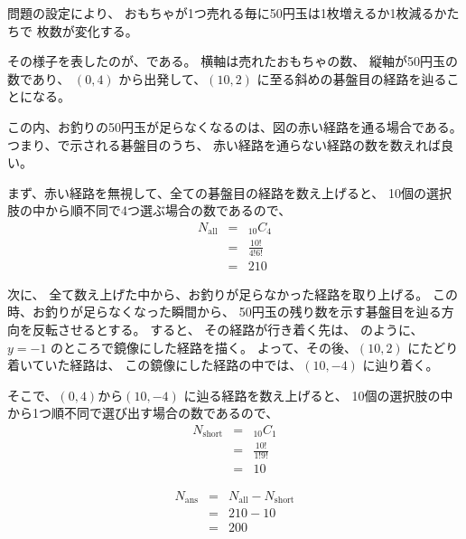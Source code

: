 問題の設定により、
おもちゃが1つ売れる毎に50円玉は1枚増えるか1枚減るかたちで
枚数が変化する。

その様子を表したのが、である。
横軸は売れたおもちゃの数、
縦軸が50円玉の数であり、
$(0,4)$ から出発して、$(10,2)$ に至る斜めの碁盤目の経路を辿ることになる。

この内、お釣りの50円玉が足らなくなるのは、図の赤い経路を通る場合である。
つまり、で示される碁盤目のうち、
赤い経路を通らない経路の数を数えれば良い。

まず、赤い経路を無視して、全ての碁盤目の経路を数え上げると、
10個の選択肢の中から順不同で4つ選ぶ場合の数であるので、
  \begin{eqnarray}
    N_{\text{all}} & = & _{10}C_{4}
  \\
      & = &
        \frac{10!}{4! 6!}
  \\
      & = &
        210
  \end{eqnarray}
  
次に、
全て数え上げた中から、お釣りが足らなかった経路を取り上げる。
この時、お釣りが足らなくなった瞬間から、
50円玉の残り数を示す碁盤目を辿る方向を反転させるとする。
すると、
その経路が行き着く先は、
のように、
$y=-1$ のところで鏡像にした経路を描く。
よって、その後、$(10,2)$ にたどり着いていた経路は、
この鏡像にした経路の中では、$(10,-4)$ に辿り着く。

そこで、$(0,4)$から$(10,-4)$ に辿る経路を数え上げると、
10個の選択肢の中から1つ順不同で選び出す場合の数であるので、
  \begin{eqnarray}
    N_{\text{short}} & = & _{10}C_{1}
  \\
      & = &
        \frac{10!}{1! 9!}
  \\
      & = &
        10
  \end{eqnarray}

  \begin{eqnarray}
    N_{\text{ans}} & = & N_{\text{all}} - N_{\text{short}}
  \\
      & = & 210 - 10
  \\
      & = & 200
  \end{eqnarray}

